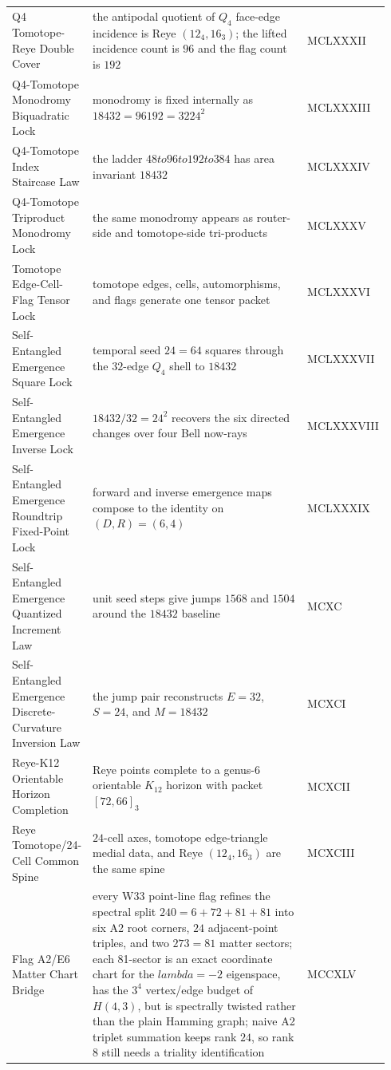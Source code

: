 \documentclass[11pt]{article}
\def\lambda{lambda}%
\def\cdot{ }%
\def\to{ to }%
\begin{document}
{\begin{longtable}{>{\raggedright\arraybackslash}p{0.18\linewidth} >{\raggedright\arraybackslash}p{0.63\linewidth} >{\raggedright\arraybackslash}p{0.13\linewidth}}
Q4 Tomotope-Reye Double Cover & the antipodal quotient of $Q_4$ face-edge incidence is Reye $(12_4,16_3)$; the lifted incidence count is $96$ and the flag count is $192$ & MCLXXXII \\
Q4-Tomotope Monodromy Biquadratic Lock & monodromy is fixed internally as $18432=96\cdot192=32\cdot24^2$ & MCLXXXIII \\
Q4-Tomotope Index Staircase Law & the ladder $48\to96\to192\to384$ has area invariant $18432$ & MCLXXXIV \\
Q4-Tomotope Triproduct Monodromy Lock & the same monodromy appears as router-side and tomotope-side tri-products & MCLXXXV \\
Tomotope Edge-Cell-Flag Tensor Lock & tomotope edges, cells, automorphisms, and flags generate one tensor packet & MCLXXXVI \\
Self-Entangled Emergence Square Lock & temporal seed $24=6\cdot4$ squares through the $32$-edge $Q_4$ shell to $18432$ & MCLXXXVII \\
Self-Entangled Emergence Inverse Lock & $18432/32=24^2$ recovers the six directed changes over four Bell now-rays & MCLXXXVIII \\
Self-Entangled Emergence Roundtrip Fixed-Point Lock & forward and inverse emergence maps compose to the identity on $(D,R)=(6,4)$ & MCLXXXIX \\
Self-Entangled Emergence Quantized Increment Law & unit seed steps give jumps $1568$ and $1504$ around the $18432$ baseline & MCXC \\
Self-Entangled Emergence Discrete-Curvature Inversion Law & the jump pair reconstructs $E=32$, $S=24$, and $M=18432$ & MCXCI \\
Reye-K12 Orientable Horizon Completion & Reye points complete to a genus-$6$ orientable $K_{12}$ horizon with packet $[72,66]_3$ & MCXCII \\
Reye Tomotope/24-Cell Common Spine & $24$-cell axes, tomotope edge-triangle medial data, and Reye $(12_4,16_3)$ are the same spine & MCXCIII \\
Flag A2/E6 Matter Chart Bridge & every W33 point-line flag refines the spectral split $240=6+72+81+81$ into six A2 root corners, $24$ adjacent-point triples, and two $27\cdot3=81$ matter sectors; each 81-sector is an exact coordinate chart for the $\lambda=-2$ eigenspace, has the $3^4$ vertex/edge budget of $H(4,3)$, but is spectrally twisted rather than the plain Hamming graph; naive A2 triplet summation keeps rank $24$, so rank $8$ still needs a triality identification & MCCXLV \\

\end{longtable}}
\end{document}
